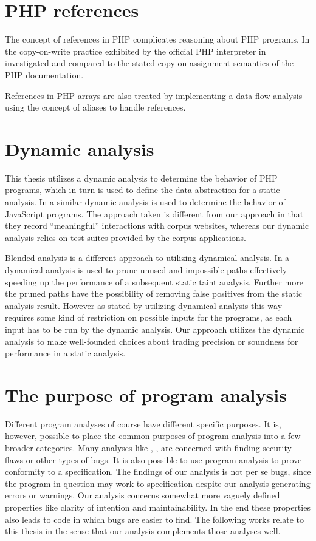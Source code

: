 \section{PHP references}
The concept of references in PHP complicates reasoning about PHP programs. In  the copy-on-write practice exhibited by the official PHP interpreter in investigated and compared to the stated copy-on-assignment semantics of the PHP documentation.

References in PHP arrays are also treated by  implementing a data-flow analysis using the concept of aliases to handle references. 

\section{Dynamic analysis}
This thesis utilizes a dynamic analysis to determine the behavior of PHP programs, which in turn is used to define the data abstraction for a static analysis. In  a similar dynamic analysis is used to determine the behavior of JavaScript programs. The approach taken is different from our approach in that they record ``meaningful'' interactions with corpus websites, whereas our dynamic analysis relies on test suites provided by the corpus applications. 

Blended analysis is a different approach to utilizing dynamical analysis. In  a dynamical analysis is used to prune unused and impossible paths effectively speeding up the performance of a subsequent static taint analysis. Further more the pruned paths have the possibility of removing false positives from the static analysis result. However as stated by  utilizing dynamical analysis this way requires some kind of restriction on possible inputs for the programs, as each input has to be run by the dynamic analysis. Our approach utilizes the dynamic analysis to make well-founded choices about trading precision or soundness for performance in a static analysis.

\section{The purpose of program analysis}
Different program analyses of course have different specific purposes. It is, however, possible to place the common purposes of program analysis into a few broader categories. Many analyses like , , are concerned with finding security flaws or other types of bugs. It is also possible to use program analysis to prove conformity to a specification. The findings of our analysis is not per se bugs, since the program in question may work to specification despite our analysis generating errors or warnings. Our analysis concerns somewhat more vaguely defined properties like clarity of intention and maintainability. In the end these properties also leads to code in which bugs are easier to find. The following works relate to this thesis in the sense that our analysis complements those analyses well.

